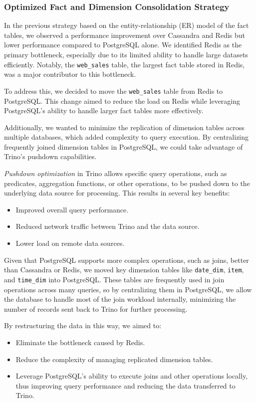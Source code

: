 \documentclass[conference]{IEEEtran}
\begin{document}
\subsubsection{Optimized Fact and Dimension Consolidation Strategy}

In the previous strategy based on the entity-relationship (ER) model of the fact tables, we observed a
performance improvement over Cassandra and Redis but lower performance compared to PostgreSQL alone.
We identified Redis as the primary bottleneck, especially due to its limited ability to handle large
datasets efficiently. Notably, the \texttt{web\_sales} table, the largest fact table stored in Redis,
was a major contributor to this bottleneck.

To address this, we decided to move the \texttt{web\_sales} table from Redis to PostgreSQL.
This change aimed to reduce the load on Redis while leveraging PostgreSQL's ability to handle larger
fact tables more effectively.

Additionally, we wanted to minimize the replication of dimension tables across multiple databases,
which added complexity to query execution. By centralizing frequently joined dimension tables in
PostgreSQL, we could take advantage of Trino’s pushdown capabilities.

\textit{Pushdown optimization} \cite{b13} in Trino allows specific query operations, such as predicates, aggregation
functions, or other operations, to be pushed down to the underlying data source for processing.
This results in several key benefits:
\begin{itemize}
	\item Improved overall query performance.
	\item Reduced network traffic between Trino and the data source.
	\item Lower load on remote data sources.
\end{itemize}

Given that PostgreSQL supports more complex operations, such as joins, better than Cassandra or Redis,
we moved key dimension tables like \texttt{date\_dim}, \texttt{item}, and \texttt{time\_dim} into PostgreSQL.
These tables are frequently used in join operations across many queries, so by centralizing them in PostgreSQL,
we allow the database to handle most of the join workload internally, minimizing the number of records sent
back to Trino for further processing.

By restructuring the data in this way, we aimed to:
\begin{itemize}
	\item Eliminate the bottleneck caused by Redis.
	\item Reduce the complexity of managing replicated dimension tables.
	\item Leverage PostgreSQL’s ability to execute joins and other operations locally, thus improving query
	      performance and reducing the data transferred to Trino.
\end{itemize}
\end{document}
